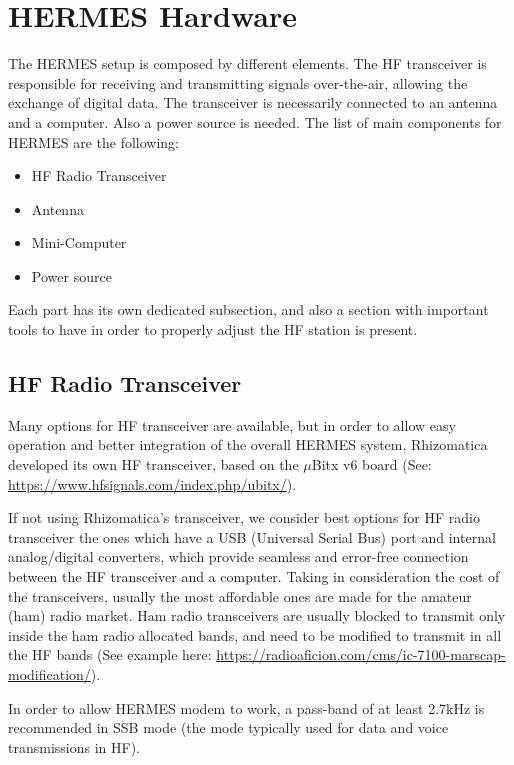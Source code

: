 
\section{HERMES Hardware}

The HERMES setup is composed by different elements. The HF
transceiver is responsible for receiving and transmitting signals
over-the-air, allowing the exchange of digital data. The transceiver
is necessarily connected to an antenna and a computer. Also a power source
is needed. The list of main components for HERMES are the following:

\begin{itemize}
\item HF Radio Transceiver
\item Antenna
\item Mini-Computer
\item Power source
\end{itemize}

Each part has its own dedicated subsection, and also a section with
important tools to have in order to properly adjust the HF station is
present.

\subsection{HF Radio Transceiver}

Many options for HF transceiver are available, but in order to allow easy
operation and better integration of the overall HERMES system, Rhizomatica
developed its own HF transceiver, based on the $\mu$Bitx v6 board (See:
\url{https://www.hfsignals.com/index.php/ubitx/}).

If not using Rhizomatica's transceiver, we consider best options for HF
radio transceiver the ones which have a USB (Universal Serial Bus) port and internal
analog/digital converters, which provide seamless and error-free
connection between the HF transceiver and a computer. Taking in
consideration the cost of the transceivers, usually the most affordable ones
are made for the amateur (ham) radio market. Ham radio transceivers are
usually blocked to transmit only inside the ham radio allocated bands, and need
to be modified to transmit in all the HF bands (See example here:
\url{https://radioaficion.com/cms/ic-7100-marscap-modification/}).

In order to allow HERMES modem to work, a pass-band of at least 2.7kHz is
recommended in SSB mode (the mode typically used for data and voice
transmissions in HF).

